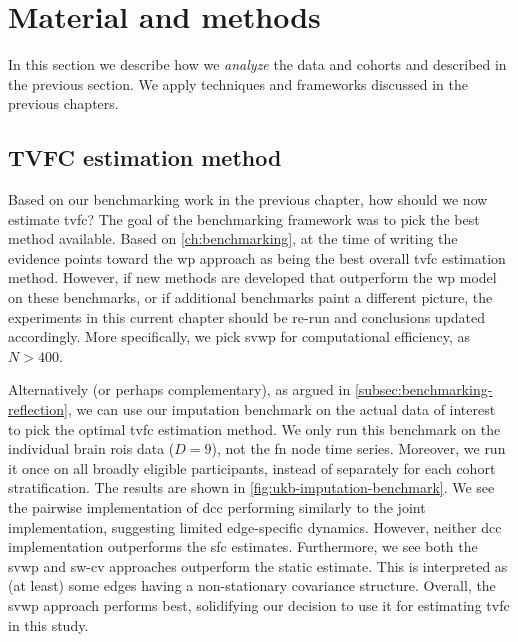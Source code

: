 \clearpage
\section{Material and methods}\label{sec:ukb-methodology}

In this section we describe how we \emph{analyze} the data and cohorts and described in the previous section.
We apply techniques and frameworks discussed in the previous chapters.

\subsection{TVFC estimation method}

Based on our benchmarking work in the previous chapter, how should we now estimate \gls{tvfc}?
The goal of the benchmarking framework was to pick the best method available.
Based on \cref{ch:benchmarking}, at the time of writing the evidence points toward the \gls{wp} approach as being the best overall \gls{tvfc} estimation method.
However, if new methods are developed that outperform the \gls{wp} model on these benchmarks, or if additional benchmarks paint a different picture, the experiments in this current chapter should be re-run and conclusions updated accordingly.
More specifically, we pick \gls{svwp} for computational efficiency, as $N > 400$.

Alternatively (or perhaps complementary), as argued in \cref{subsec:benchmarking-reflection}, we can use our imputation benchmark on the actual data of interest to pick the optimal \gls{tvfc} estimation method.
We only run this benchmark on the individual brain \glspl{roi} data ($D = 9$), not the \gls{fn} node time series.
Moreover, we run it once on all broadly eligible participants, instead of separately for each cohort stratification.
%
The results are shown in \cref{fig:ukb-imputation-benchmark}.
We see the pairwise implementation of \gls{dcc} performing similarly to the joint implementation, suggesting limited edge-specific dynamics.
However, neither \gls{dcc} implementation outperforms the \gls{sfc} estimates.
Furthermore, we see both the \gls{svwp} and \gls{sw-cv} approaches outperform the static estimate.
This is interpreted as (at least) some edges having a non-stationary covariance structure.
Overall, the \gls{svwp} approach performs best, solidifying our decision to use it for estimating \gls{tvfc} in this study.


